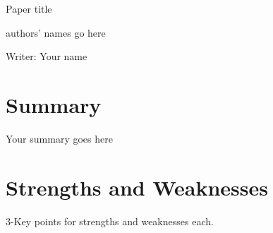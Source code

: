 \documentclass[letterpaper,11pt]{article}
\begin{document}
\begin{center}
{\Large Paper title} 

{authors' names go here}
\bigskip

{\large Writer: Your name}
\date{\today}
\end{center}


\section{Summary}

Your summary goes here 



\section{Strengths and Weaknesses}

3-Key points for strengths and weaknesses each.

\end{document}
